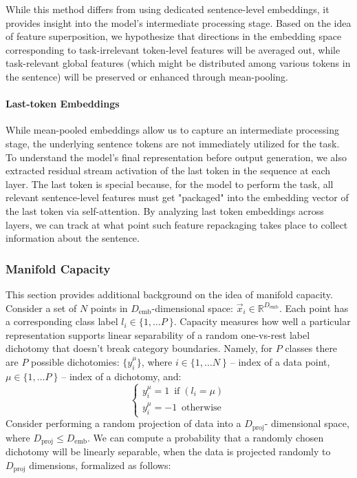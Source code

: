 While this method differs from using dedicated sentence-level embeddings, it provides insight into the model's intermediate processing stage. Based on the idea of feature superposition, we hypothesize that directions in the embedding space corresponding to task-irrelevant token-level features will be averaged out, while task-relevant global features (which might be distributed among various tokens in the sentence) will be preserved or enhanced through mean-pooling.


\paragraph{Last-token Embeddings}
While mean-pooled embeddings allow us to capture an intermediate processing stage, the underlying sentence tokens are not immediately utilized for the task. To understand the model's final representation before output generation, we also extracted residual stream activation of the last token in the sequence at each layer. The last token is special because, for the model to perform the task, all relevant sentence-level features must get "packaged" into the embedding vector of the last token via self-attention. By analyzing last token embeddings across layers, we can track at what point such feature repackaging takes place to collect information about the sentence.


\subsubsection{Manifold Capacity}
\label{appendix:manifold_capacity}

This section provides additional background on the idea of manifold capacity. Consider a set of $N$ points in $D_\text{emb}$-dimensional space: $\vec x_i \in \mathbb R^{D_\text{emb}}$. Each point has a corresponding class label $l_i \in \{1,\dots P\ \}$. Capacity measures how well a particular representation supports linear separability of a random one-vs-rest label dichotomy that doesn't break category boundaries. Namely, for $P$ classes there are $P$ possible dichotomies: $\{ y_i^\mu \}$, where $i \in \{1,\dots N\ \}$ – index of a data point, $\mu \in \{1,\dots P\ \}$ – index of a dichotomy, and:
$$
\begin{cases} y_i^\mu = 1 \ \operatorname{if} \left( l_i = \mu \right)  \\
y_i^\mu = -1 \ \operatorname{otherwise}
\end{cases}
$$
Consider performing a random projection of data into a $D_\text{proj}$- dimensional space, where $D_\text{proj} \leq D_\text{emb}$. We can compute a probability that a randomly chosen dichotomy will be linearly separable, when the data is projected randomly to $D_\text{proj}$ dimensions, formalized as follows:


